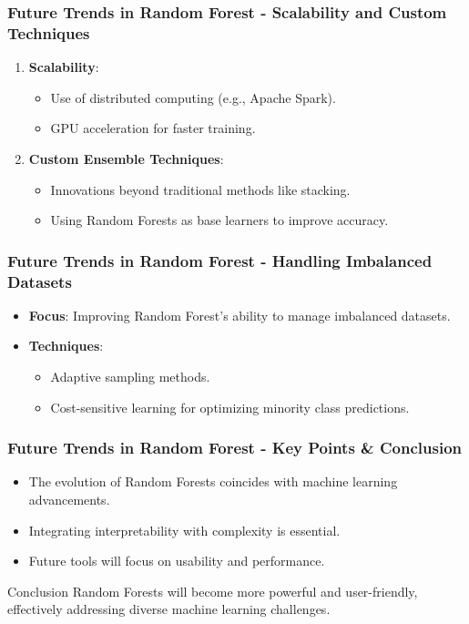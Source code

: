 \documentclass[aspectratio=169]{beamer}
\begin{document}
\begin{frame}[fragile]
    \frametitle{Future Trends in Random Forest - Scalability and Custom Techniques}
    
    \begin{enumerate}
        \item \textbf{Scalability}:
            \begin{itemize}
                \item Use of distributed computing (e.g., Apache Spark).
                \item GPU acceleration for faster training.
            \end{itemize}
        \item \textbf{Custom Ensemble Techniques}:
            \begin{itemize}
                \item Innovations beyond traditional methods like stacking.
                \item Using Random Forests as base learners to improve accuracy.
            \end{itemize}
    \end{enumerate}
\end{frame}

\begin{frame}[fragile]
    \frametitle{Future Trends in Random Forest - Handling Imbalanced Datasets}
    
    \begin{itemize}
        \item \textbf{Focus}: Improving Random Forest's ability to manage imbalanced datasets.
        \item \textbf{Techniques}:
            \begin{itemize}
                \item Adaptive sampling methods.
                \item Cost-sensitive learning for optimizing minority class predictions.
            \end{itemize}
    \end{itemize}
\end{frame}

\begin{frame}[fragile]
    \frametitle{Future Trends in Random Forest - Key Points & Conclusion}
    
    \begin{itemize}
        \item The evolution of Random Forests coincides with machine learning advancements.
        \item Integrating interpretability with complexity is essential.
        \item Future tools will focus on usability and performance.
    \end{itemize}
    
    \begin{block}{Conclusion}
        Random Forests will become more powerful and user-friendly, effectively addressing diverse machine learning challenges.
    \end{block}
\end{frame}
\end{document}
